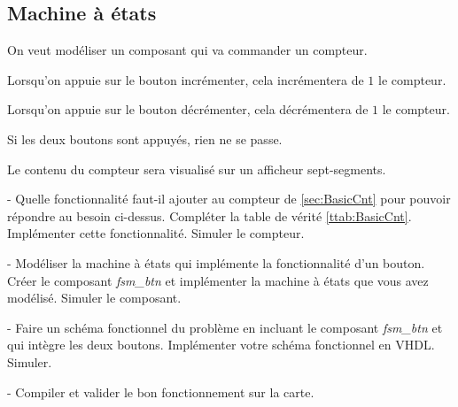 \subsection{Machine à états}
On veut modéliser un composant qui va commander un compteur.

Lorsqu'on appuie sur le bouton incrémenter, cela incrémentera de $1$ le compteur.

Lorsqu'on appuie sur le bouton décrémenter, cela décrémentera de $1$ le compteur.

Si les deux boutons sont appuyés, rien ne se passe.

Le contenu du compteur sera visualisé sur un afficheur sept-segments.

\medskip

- Quelle fonctionnalité faut-il ajouter au compteur de \ref{sec:BasicCnt} pour pouvoir répondre au besoin ci-dessus. Compléter la table de vérité \ref{ttab:BasicCnt}. Implémenter cette fonctionnalité. Simuler le compteur.


\medskip

- Modéliser la machine à états qui implémente la fonctionnalité d'un bouton. Créer le composant \textit{fsm\_btn} et implémenter la machine à états que vous avez modélisé. Simuler le composant.

\medskip

- Faire un schéma fonctionnel du problème en incluant le composant \textit{fsm\_btn} et qui intègre les deux boutons. Implémenter votre schéma fonctionnel en VHDL. Simuler.

\medskip

- Compiler et valider le bon fonctionnement sur la carte.
